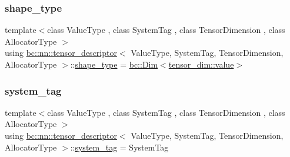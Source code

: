 \mbox{\label{structbc_1_1nn_1_1tensor__descriptor_ac71505e6bbfeba13ce3c0ba9bc0b404d}} 
\subsubsection{\texorpdfstring{shape\+\_\+type}{shape\_type}}
{\footnotesize\ttfamily template$<$class Value\+Type , class System\+Tag , class Tensor\+Dimension , class Allocator\+Type $>$ \\
using \hyperlink{structbc_1_1nn_1_1tensor__descriptor}{bc\+::nn\+::tensor\+\_\+descriptor}$<$ Value\+Type, System\+Tag, Tensor\+Dimension, Allocator\+Type $>$\+::\hyperlink{structbc_1_1nn_1_1tensor__descriptor_ac71505e6bbfeba13ce3c0ba9bc0b404d}{shape\+\_\+type} =  \hyperlink{structbc_1_1Dim}{bc\+::\+Dim}$<$\hyperlink{structbc_1_1traits_1_1Integer_a853b05936b98e64c79163395c3624e32}{tensor\+\_\+dim\+::value}$>$}

\mbox{\label{structbc_1_1nn_1_1tensor__descriptor_afc32b2c3143020f26bd9c50f530d399c}} 
\subsubsection{\texorpdfstring{system\+\_\+tag}{system\_tag}}
{\footnotesize\ttfamily template$<$class Value\+Type , class System\+Tag , class Tensor\+Dimension , class Allocator\+Type $>$ \\
using \hyperlink{structbc_1_1nn_1_1tensor__descriptor}{bc\+::nn\+::tensor\+\_\+descriptor}$<$ Value\+Type, System\+Tag, Tensor\+Dimension, Allocator\+Type $>$\+::\hyperlink{structbc_1_1nn_1_1tensor__descriptor_afc32b2c3143020f26bd9c50f530d399c}{system\+\_\+tag} =  System\+Tag}

\mbox{\label{structbc_1_1nn_1_1tensor__descriptor_ae2cb1d96346b40d67764bd9daf726f74}} 
